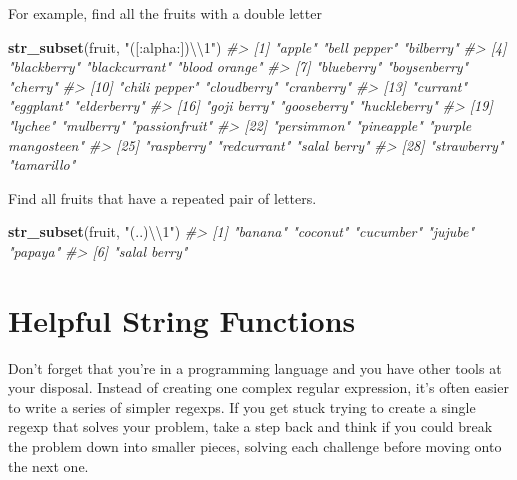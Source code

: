 \documentclass[]{book}
\newenvironment{Shaded}{\begin{snugshade}}{\end{snugshade}}
\newcommand{\CharTok}[1]{\textcolor[rgb]{0.31,0.60,0.02}{#1}}
\newcommand{\CommentTok}[1]{\textcolor[rgb]{0.56,0.35,0.01}{\textit{#1}}}
\newcommand{\KeywordTok}[1]{\textcolor[rgb]{0.13,0.29,0.53}{\textbf{#1}}}
\newcommand{\NormalTok}[1]{#1}
\newcommand{\StringTok}[1]{\textcolor[rgb]{0.31,0.60,0.02}{#1}}
\theoremstyle{definition}
\theoremstyle{definition}
\theoremstyle{definition}
\theoremstyle{remark}
\begin{document}
For example, find all the fruits with a double letter

\begin{Shaded}
\begin{Highlighting}[]
\KeywordTok{str_subset}\NormalTok{(fruit, }\StringTok{"([:alpha:])}\CharTok{\textbackslash{}\textbackslash{}}\StringTok{1"}\NormalTok{)}
\CommentTok{#>  [1] "apple"             "bell pepper"       "bilberry"         }
\CommentTok{#>  [4] "blackberry"        "blackcurrant"      "blood orange"     }
\CommentTok{#>  [7] "blueberry"         "boysenberry"       "cherry"           }
\CommentTok{#> [10] "chili pepper"      "cloudberry"        "cranberry"        }
\CommentTok{#> [13] "currant"           "eggplant"          "elderberry"       }
\CommentTok{#> [16] "goji berry"        "gooseberry"        "huckleberry"      }
\CommentTok{#> [19] "lychee"            "mulberry"          "passionfruit"     }
\CommentTok{#> [22] "persimmon"         "pineapple"         "purple mangosteen"}
\CommentTok{#> [25] "raspberry"         "redcurrant"        "salal berry"      }
\CommentTok{#> [28] "strawberry"        "tamarillo"}
\end{Highlighting}
\end{Shaded}

Find all fruits that have a repeated pair of letters.

\begin{Shaded}
\begin{Highlighting}[]
\KeywordTok{str_subset}\NormalTok{(fruit, }\StringTok{"(..)}\CharTok{\textbackslash{}\textbackslash{}}\StringTok{1"}\NormalTok{)}
\CommentTok{#> [1] "banana"      "coconut"     "cucumber"    "jujube"      "papaya"     }
\CommentTok{#> [6] "salal berry"}
\end{Highlighting}
\end{Shaded}

\hypertarget{helpful-string-functions}{%
\section{Helpful String Functions}\label{helpful-string-functions}}

Don't forget that you're in a programming language and you have other
tools at your disposal. Instead of creating one complex regular
expression, it's often easier to write a series of simpler regexps. If
you get stuck trying to create a single regexp that solves your problem,
take a step back and think if you could break the problem down into
smaller pieces, solving each challenge before moving onto the next one.
\end{document}
